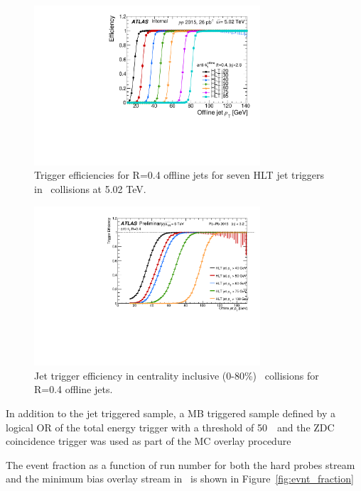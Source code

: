   \begin{figure}[h]
 \centerline{
 \includegraphics[width=0.75\textwidth]{figures/main/general/Eff_pp_5TeV_central.pdf}
}
 \caption{Trigger efficiencies for R=0.4 offline jets for seven HLT jet triggers in \pp\ collisions at 5.02 TeV.}
\label{fig:Trigger_pp5}
 \end{figure}


 \begin{figure}[h]
    \centerline{
       \includegraphics[width=0.75\textwidth]{figures/main/general/trigger_eff_PbPb_CentInclusive.pdf}
    }
    \caption{Jet trigger efficiency in centrality inclusive (0-80\%) \pbpb\ collisions for R=0.4 offline
    jets.}
    \label{fig:Trigger_PbPb}
 \end{figure}

In addition to the jet triggered sample, a MB triggered sample defined by a logical OR of the total energy trigger with a threshold of 50~\GeV\ and the ZDC coincidence trigger was used as part of the MC overlay procedure

The event fraction as a function of run number for both the hard probes stream and the minimum bias overlay stream in \pbpb\ is shown in Figure~\ref{fig:evnt_fraction}


